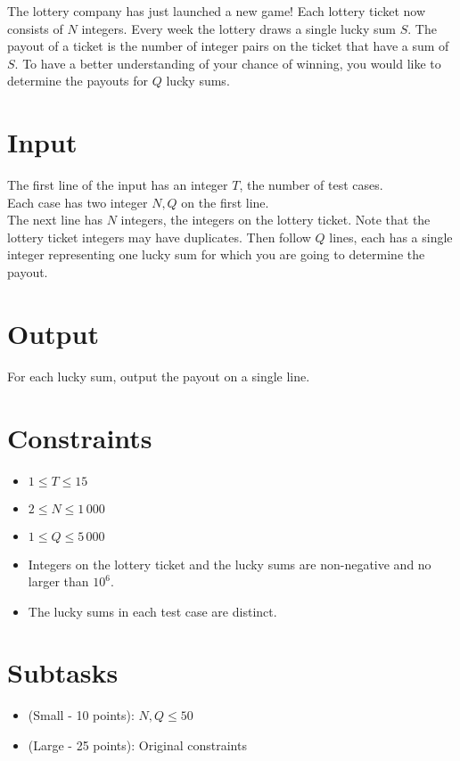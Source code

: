 
The lottery company has just launched a new game!
Each lottery ticket now consists of $N$ integers.
Every week the lottery draws a single lucky sum $S$.
The payout of a ticket is the number of integer pairs on the ticket that have a sum of $S$.
To have a better understanding of your chance of winning, you would like to determine the payouts for $Q$ lucky sums.

\section*{Input}

The first line of the input has an integer $T$, the number of test cases.\\
Each case has two integer $N, Q$ on the first line.\\
The next line has $N$ integers, the integers on the lottery ticket.
Note that the lottery ticket integers may have duplicates.
Then follow $Q$ lines, each has a single integer representing one lucky sum for which you are going to determine the payout.

\section*{Output}
For each lucky sum, output the payout on a single line.

\section*{Constraints}
\begin{itemize}
\item $1 \leq T\leq 15$
\item $2 \leq N \leq 1\,000$
\item $1 \leq Q \leq 5\,000$
\item Integers on the lottery ticket and the lucky sums are non-negative and no larger than $10^6$.
\item The lucky sums in each test case are distinct.
\end{itemize}

\section*{Subtasks}
\begin{itemize}
\item (Small - 10 points): $N, Q \leq 50$
\item (Large - 25 points): Original constraints
\end{itemize}
